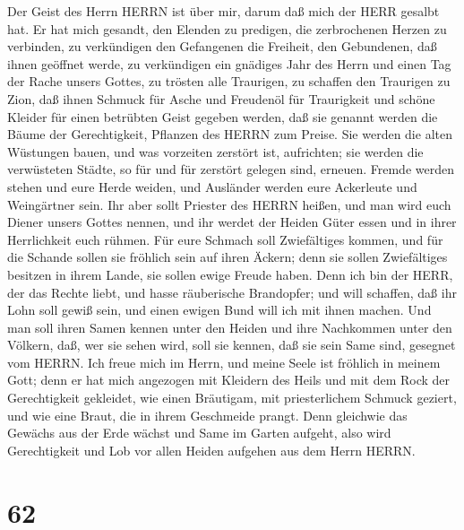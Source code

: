  Der Geist des Herrn HERRN ist über mir, darum daß mich der
HERR gesalbt hat. Er hat mich gesandt, den Elenden zu predigen, die
zerbrochenen Herzen zu verbinden, zu verkündigen den Gefangenen die
Freiheit, den Gebundenen, daß ihnen geöffnet werde,  zu
verkündigen ein gnädiges Jahr des Herrn und einen Tag der Rache unsers
Gottes, zu trösten alle Traurigen,  zu schaffen den
Traurigen zu Zion, daß ihnen Schmuck für Asche und Freudenöl für
Traurigkeit und schöne Kleider für einen betrübten Geist gegeben werden,
daß sie genannt werden die Bäume der Gerechtigkeit, Pflanzen des HERRN
zum Preise.  Sie werden die alten Wüstungen bauen, und was
vorzeiten zerstört ist, aufrichten; sie werden die verwüsteten Städte,
so für und für zerstört gelegen sind, erneuen.  Fremde
werden stehen und eure Herde weiden, und Ausländer werden eure
Ackerleute und Weingärtner sein.  Ihr aber sollt Priester
des HERRN heißen, und man wird euch Diener unsers Gottes nennen, und ihr
werdet der Heiden Güter essen und in ihrer Herrlichkeit euch rühmen.
 Für eure Schmach soll Zwiefältiges kommen, und für die
Schande sollen sie fröhlich sein auf ihren Äckern; denn sie sollen
Zwiefältiges besitzen in ihrem Lande, sie sollen ewige Freude haben.
 Denn ich bin der HERR, der das Rechte liebt, und hasse
räuberische Brandopfer; und will schaffen, daß ihr Lohn soll gewiß sein,
und einen ewigen Bund will ich mit ihnen machen.  Und man
soll ihren Samen kennen unter den Heiden und ihre Nachkommen unter den
Völkern, daß, wer sie sehen wird, soll sie kennen, daß sie sein Same
sind, gesegnet vom HERRN.  Ich freue mich im Herrn, und
meine Seele ist fröhlich in meinem Gott; denn er hat mich angezogen mit
Kleidern des Heils und mit dem Rock der Gerechtigkeit gekleidet, wie
einen Bräutigam, mit priesterlichem Schmuck geziert, und wie eine Braut,
die in ihrem Geschmeide prangt.  Denn gleichwie das Gewächs
aus der Erde wächst und Same im Garten aufgeht, also wird Gerechtigkeit
und Lob vor allen Heiden aufgehen aus dem Herrn HERRN.

\hypertarget{section-61}{%
\section{62}\label{section-61}}

